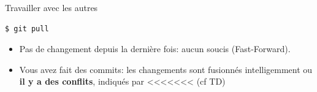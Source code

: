 \documentclass[presentation]{beamer}
\begin{document}
\begin{frame}[fragile]{Travailler avec les autres}
\begin{multicols}{2}
\begin{lstlisting}
$ git pull
\end{lstlisting}
\begin{figure}%
\end{figure}
\begin{itemize}
	\item[1]<2-3> Pas de changement depuis la dernière fois: aucun soucis (Fast-Forward).
	\item[2]<3> Vous avez fait des commits: les changements sont fusionnés intelligemment ou \textbf{il y a des conflits}, indiqués par <<<<<<< (cf TD)
\end{itemize}
\end{multicols}
\end{frame}
\end{document}
